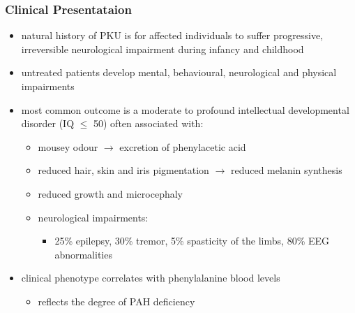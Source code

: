 \documentclass{scrartcl}
\begin{document}
\subsubsection{Clinical Presentataion}
\label{sec:orgc9662c1}
\begin{itemize}
\item natural history of PKU is for affected individuals to suffer
progressive, irreversible neurological impairment during infancy and
childhood
\item untreated patients develop mental, behavioural, neurological and
physical impairments
\item most common outcome is a moderate to profound intellectual
developmental disorder (IQ \(\le\) 50) often associated with:
\begin{itemize}
\item mousey odour \(\to\) excretion of phenylacetic acid
\item reduced hair, skin and iris pigmentation \(\to\) reduced melanin synthesis
\item reduced growth and microcephaly
\item neurological impairments:
\begin{itemize}
\item 25\% epilepsy, 30\% tremor, 5\% spasticity of the limbs, 80\% EEG abnormalities
\end{itemize}
\end{itemize}
\item clinical phenotype correlates with phenylalanine blood levels
\begin{itemize}
\item reflects the degree of PAH deficiency
\end{itemize}
\end{itemize}
\end{document}
